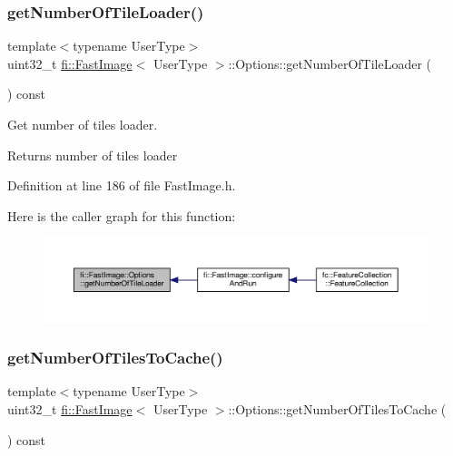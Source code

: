 \subsubsection{\texorpdfstring{get\+Number\+Of\+Tile\+Loader()}{getNumberOfTileLoader()}}
{\footnotesize\ttfamily template$<$typename User\+Type$>$ \\
uint32\+\_\+t \hyperlink{classfi_1_1FastImage}{fi\+::\+Fast\+Image}$<$ User\+Type $>$\+::Options\+::get\+Number\+Of\+Tile\+Loader (\begin{DoxyParamCaption}{ }\end{DoxyParamCaption}) const\hspace{0.3cm}{\ttfamily [inline]}}



Get number of tiles loader. 

\begin{DoxyReturn}{Returns}
number of tiles loader 
\end{DoxyReturn}


Definition at line 186 of file Fast\+Image.\+h.

Here is the caller graph for this function\+:
\nopagebreak
\begin{figure}[H]
\begin{center}
\leavevmode
\includegraphics[width=350pt]{dc/db9/classfi_1_1FastImage_1_1Options_a409187a3f6f176cd9e551c3aaed2d944_icgraph}
\end{center}
\end{figure}
\mbox{\label{classfi_1_1FastImage_1_1Options_a39db813117479230ea638119ac587bab}} 
\subsubsection{\texorpdfstring{get\+Number\+Of\+Tiles\+To\+Cache()}{getNumberOfTilesToCache()}}
{\footnotesize\ttfamily template$<$typename User\+Type$>$ \\
uint32\+\_\+t \hyperlink{classfi_1_1FastImage}{fi\+::\+Fast\+Image}$<$ User\+Type $>$\+::Options\+::get\+Number\+Of\+Tiles\+To\+Cache (\begin{DoxyParamCaption}{ }\end{DoxyParamCaption}) const\hspace{0.3cm}{\ttfamily [inline]}}



